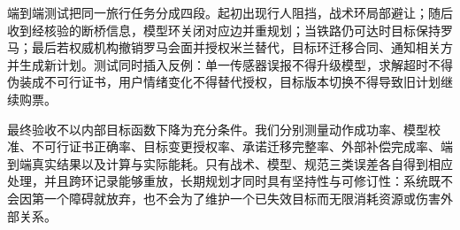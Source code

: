 端到端测试把同一旅行任务分成四段。起初出现行人阻挡，战术环局部避让；随后收到经核验的断桥信息，模型环关闭对应边并重规划；当铁路仍可达时目标保持罗马；最后若权威机构撤销罗马会面并授权米兰替代，目标环迁移合同、通知相关方并生成新计划。测试同时插入反例：单一传感器误报不得升级模型，求解超时不得伪装成不可行证书，用户情绪变化不得替代授权，目标版本切换不得导致旧计划继续购票。

最终验收不以内部目标函数下降为充分条件。我们分别测量动作成功率、模型校准、不可行证书正确率、目标变更授权率、承诺迁移完整率、外部补偿完成率、端到端真实结果以及计算与实际能耗。只有战术、模型、规范三类误差各自得到相应处理，并且跨环记录能够重放，长期规划才同时具有坚持性与可修订性：系统既不会因第一个障碍就放弃，也不会为了维护一个已失效目标而无限消耗资源或伤害外部关系。

